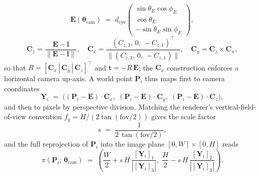 \begin{equation}
\label{eq:eye}
    \mathbf{E}(\boldsymbol{\theta}_{\mathrm{cam}})
    \;=\; d_{\mathrm{eye}}
    \begin{pmatrix}
        \sin\theta_{E}\cos\phi_{E} \\
        \cos\theta_{E} \\
        -\sin\theta_{E}\sin\phi_{E}
    \end{pmatrix},
\end{equation}
\begin{equation}
\label{eq:basis}
    \mathbf{C}_{z} = \frac{\mathbf{E} - \mathbf{l}}
                           {\|\mathbf{E} - \mathbf{l}\|},
    \quad
    \mathbf{C}_{x} = \frac{(C_{z,3},\,0,\,-C_{z,1})^{\!\top}}
                           {\|(C_{z,3},\,0,\,-C_{z,1})\|},
    \quad
    \mathbf{C}_{y} = \mathbf{C}_{z} \times \mathbf{C}_{x},
\end{equation}
so that $R = [\mathbf{C}_{x}\,|\,\mathbf{C}_{y}\,|\,\mathbf{C}_{z}]^{\!\top}$ and
$\mathbf{t} = -R\,\mathbf{E}$; the $\mathbf{C}_{x}$ construction
enforces a horizontal camera up-axis. A world point $\mathbf{P}_{i}$
thus maps first to camera coordinates
\begin{equation}
\label{eq:screen}
    \mathbf{Y}_{i}
    \;=\;
    \bigl(
      (\mathbf{P}_{i} - \mathbf{E})\!\cdot\!\mathbf{C}_{x},\;
      (\mathbf{P}_{i} - \mathbf{E})\!\cdot\!\mathbf{C}_{y},\;
      (\mathbf{P}_{i} - \mathbf{E})\!\cdot\!\mathbf{C}_{z}
    \bigr),
\end{equation}
and then to pixels by perspective division. Matching the renderer's
vertical-field-of-view convention $f_{y} = H/(2\tan(\mathrm{fov}/2))$
gives the scale factor
\begin{equation}
\label{eq:scale}
    s \;=\; \frac{1}{2\,\tan(\mathrm{fov}/2)},
\end{equation}
and the full reprojection of $\mathbf{P}_{i}$ into the image plane
$[0, W]\times[0, H]$ reads
\begin{equation}
\label{eq:project}
    \pi(\mathbf{P}_{i};\,\boldsymbol{\theta}_{\mathrm{cam}})
    \;=\;
    \left(
        \frac{W}{2} + s\,H\,\frac{[\mathbf{Y}_{i}]_{1}}{|[\mathbf{Y}_{i}]_{3}|},\;
        \frac{H}{2} - s\,H\,\frac{[\mathbf{Y}_{i}]_{2}}{|[\mathbf{Y}_{i}]_{3}|}
    \right).
\end{equation}

